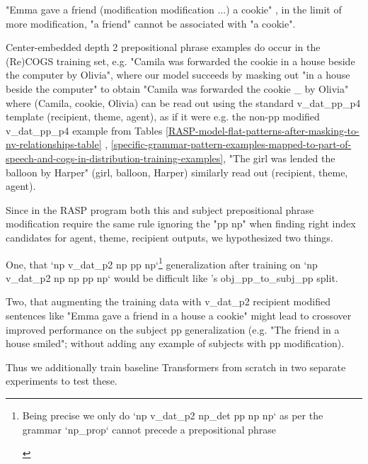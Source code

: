 \documentclass[11pt]{article}
\begin{document}
{\begin{footnotesize}
"Emma gave a friend (modification modification ...) a cookie" , in the limit of more modification, "a friend" cannot be associated with "a cookie".

Center-embedded depth 2 prepositional phrase examples do occur in the (Re)COGS training set, e.g. "Camila was forwarded the cookie in a house beside the computer by Olivia", where our model succeeds by masking out "in a house beside the computer" to obtain "Camila was forwarded the cookie \_ by Olivia" where (Camila, cookie, Olivia) can be read out using the standard v\_dat\_pp\_p4 template (recipient, theme, agent), as if it were e.g. the non-pp modified v\_dat\_pp\_p4 example from Tables \ref{RASP-model-flat-patterns-after-masking-to-nv-relationships-table} , \ref{specific-grammar-pattern-examples-mapped-to-part-of-speech-and-cogs-in-distribution-training-examples}, "The girl was lended the balloon by Harper" (girl, balloon, Harper) similarly read out (recipient, theme, agent).
\end{footnotesize}}

Since in the RASP program both this and subject prepositional phrase modification require the same rule ignoring the "pp np" when finding right index candidates for agent, theme, recipient outputs, we hypothesized two things.

One, that `np v\_dat\_p2 np pp np`\footnote{\begin{footnotesize}Being precise we only do `np v\_dat\_p2 np\_det pp np np` as per the grammar `np\_prop` cannot precede a prepositional phrase\end{footnotesize}} generalization after training on `np v\_dat\_p2 np np pp np` would be difficult like \cite{Wu2023}'s obj\_pp\_to\_subj\_pp split.

Two, that augmenting the training data with v\_dat\_p2 recipient modified sentences like "Emma gave a friend in a house a cookie" might lead to crossover improved performance on the subject pp generalization (e.g. "The friend in a house smiled"; without adding any example of subjects with pp modification).

Thus we additionally train \cite{Wu2023} baseline Transformers from scratch in two separate experiments to test these.
\end{document}
